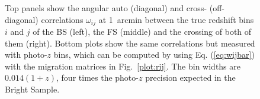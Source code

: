 \begin{figure}
\centering
{}
\caption{Top panels show the angular auto (diagonal) and cross- (off-diagonal) correlations $\omega_{ij}$ at 1~arcmin between the true redshift bins $i$ and $j$ of the BS (left), the FS (middle) and the crossing of both of them (right). Bottom plots show the same correlations but measured with photo-$z$ bins, which can be computed by using Eq. (\ref{eq:wijbar}) with the migration matrices in Fig.~\ref{plot:rij}. The bin widths are $0.014(1+z)$, four times the photo-$z$ precision expected in the Bright Sample.}
\label{plot:wij}
\end{figure}

